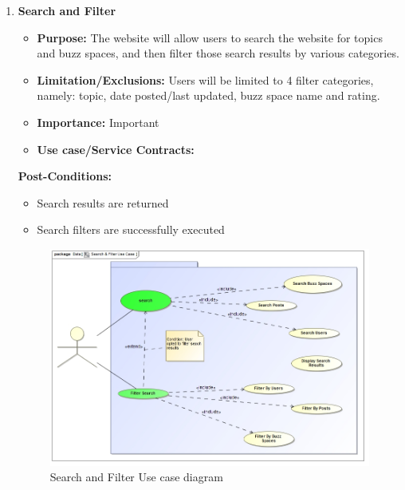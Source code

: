 \documentclass[11pt]{article}
\begin{document}
\begin{enumerate}
\item \textbf{Search and Filter }
\begin{itemize}
\item \textbf{Purpose: }The website will allow users to search the website for topics and buzz spaces, and then filter those search results by various categories. \newline \newline
	\item  \textbf{Limitation/Exclusions: }
Users will be limited to 4 filter categories, namely: topic, date posted/last updated, buzz space name and rating.

\item \textbf{Importance: } Important

\item \textbf{Use case/Service Contracts: } \newline \newline
\end{itemize}
	  \textbf{Post-Conditions: }
	   
	  \begin{itemize}
	  \item Search results are returned
	  \item	Search filters are successfully executed
	  \end{itemize}
	  \graphicspath{ {../Diagrams/Sphe/Search&Filter/} }
	  \begin{figure}[H]	
    	\includegraphics[scale=0.5]{UseCase.jpg}
    	\caption{Search and Filter Use case diagram}
	\end{figure}
	

\end{enumerate}
\end{document}
